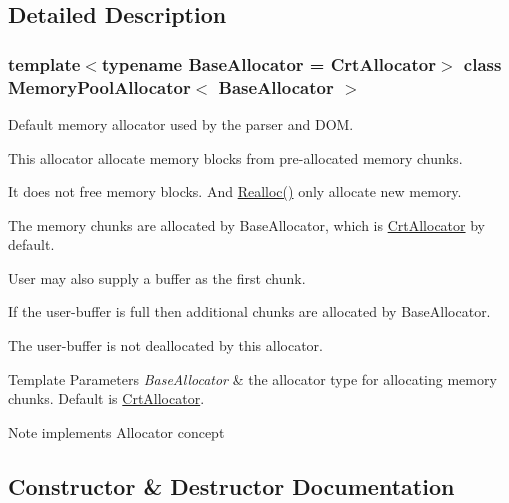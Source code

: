 \subsection{Detailed Description}
\subsubsection*{template$<$typename Base\+Allocator = Crt\+Allocator$>$\newline
class Memory\+Pool\+Allocator$<$ Base\+Allocator $>$}

Default memory allocator used by the parser and D\+OM. 

This allocator allocate memory blocks from pre-\/allocated memory chunks.

It does not free memory blocks. And \hyperlink{class_memory_pool_allocator_aba75280d42184b0ad414243f7f5ac6c7}{Realloc()} only allocate new memory.

The memory chunks are allocated by Base\+Allocator, which is \hyperlink{class_crt_allocator}{Crt\+Allocator} by default.

User may also supply a buffer as the first chunk.

If the user-\/buffer is full then additional chunks are allocated by Base\+Allocator.

The user-\/buffer is not deallocated by this allocator.


\begin{DoxyTemplParams}{Template Parameters}
{\em Base\+Allocator} & the allocator type for allocating memory chunks. Default is \hyperlink{class_crt_allocator}{Crt\+Allocator}. \\
\hline
\end{DoxyTemplParams}
\begin{DoxyNote}{Note}
implements Allocator concept 
\end{DoxyNote}


\subsection{Constructor \& Destructor Documentation}
\mbox{\label{class_memory_pool_allocator_aeec85ac657f242ac5620115141be5209}} 
